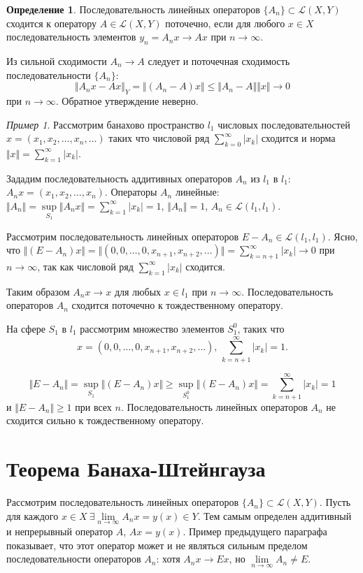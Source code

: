 \documentclass[12pt,a4paper,titlepage,oneside]{book}
\theoremstyle{definition}
\newtheorem*{definition}{Определение}
\theoremstyle{plain}
\theoremstyle{break}
\theoremstyle{remark}
\theoremstyle{remark}
\newtheorem*{example}{Пример}
\theoremstyle{remark}
\theoremstyle{remark}
\theoremstyle{plain}
\theoremstyle{plain}
\begin{document}
\begin{definition}
Последовательность линейных операторов $\{A_n\} \subset \mathcal{L}(X,Y)$ сходится к оператору $A\in \mathcal{L}(X,Y)$ поточечно, если для любого $x\in X$ последовательность элементов $y_n=A_nx\to Ax$ при $n\to \infty$.
\end{definition}

Из сильной сходимости $A_n\to A$ следует и поточечная сходимость последовательности $\{A_n\}$:
$$\Vert A_nx-Ax\Vert_Y = \Vert(A_n-A)x\Vert\le \Vert A_n-A\Vert \Vert x\Vert\to 0$$ 
при $n\to \infty$.
Обратное утверждение неверно.

\begin{example}
Рассмотрим банахово пространство $l_1$ числовых последовательностей $x=(x_1,x_2,\ldots,x_n,\ldots)$ таких что числовой ряд $\displaystyle\sum_{k=0}^\infty \lvert x_k\rvert $ сходится и норма $\Vert x\Vert=\displaystyle\sum_{k=1}^\infty \lvert x_k\rvert$.

Зададим последовательность аддитивных операторов $A_n$ из $l_1$ в $l_1$: 
$A_nx=(x_1,x_2,\ldots,x_n)$.
Операторы $A_n$ линейные:
$\Vert A_n\Vert=\sup \limits_{S_1} \Vert A_nx\Vert=\displaystyle\sum_{k=1}^\infty \lvert x_k\rvert =1$, $\Vert A_n\Vert=1$, $A_n\in \mathcal{L}(l_1,l_1)$.

Рассмотрим последовательность линейных операторов $E-A_n\in \mathcal{L}(l_1,l_1)$. Ясно, что $\Vert(E-A_n)x\Vert=\Vert(0,0,\ldots,0,x_{n+1},x_{n+2},\ldots)\Vert=\displaystyle\sum_{k=n+1}^\infty \lvert x_k\rvert  \to 0$ при $n\to \infty$, так как числовой ряд $\displaystyle\sum_{k=1}^\infty \lvert x_k\rvert $ сходится.

Таким образом $A_nx\to x$ для любых $x\in l_1$ при $n\to \infty$. Последовательность операторов $A_n$ сходится поточечно к тождественному оператору.

На сфере $S_1$ в $l_1$ рассмотрим множество элементов $S_1^0$, таких что 
$$x=(0,0,\ldots,0,x_{n+1},x_{n+2},\ldots) \mbox{, } \displaystyle\sum_{k=n+1}^\infty \lvert x_k\rvert=1.$$

$$\Vert E-A_n\Vert=\sup \limits_{S_1} \Vert(E-A_n)x\Vert \geqslant \sup \limits_{S_1^0} \Vert(E-A_n)x\Vert=\displaystyle\sum_{k=n+1}^\infty \lvert x_k\rvert=1$$
и $\Vert E-A_n\Vert \geqslant 1$ при всех $n$. Последовательность линейных операторов $A_n$ не сходится сильно к тождественному оператору.

\end{example}

\section{Теорема Банаха-Штейнгауза}
Рассмотрим последовательность линейных операторов $\lbrace A_n \rbrace \subset \mathcal{L}(X,Y)$. Пусть для каждого $x \in X\ \exists \lim\limits_{n\to \infty}A_n x = y(x) \in Y$. Тем самым определен аддитивный и непрерывный оператор $A$, $Ax = y(x)$. Пример предыдущего параграфа показывает, что этот оператор может и не являться сильным пределом последовательности операторов $A_n$: хотя $A_n x \to E x$, но $\lim \limits_{n \to \infty} A_n \ne E$.
\end{document}
